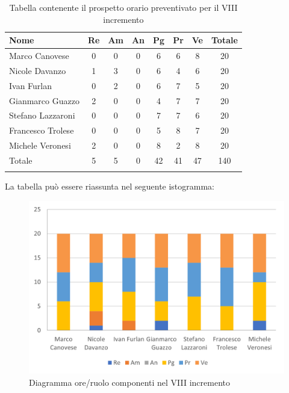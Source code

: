 \begin{longtable}{|l|c|c|c|c|c|c|c|}
	\hline
	\rowcolor{lighter-grayer}
	\textbf{Nome}     & \textbf{Re} & \textbf{Am} & \textbf{An} & \textbf{Pg} & \textbf{Pr} & \textbf{Ve} & \textbf{Totale} \\
	\hline
	\endfirsthead

	\hline
	Marco Canovese    & 0           & 0           & 0           & 6           & 6           & 8           & 20               \\
	\hline
	\hline
	Nicole Davanzo    & 1           & 3           & 0           & 6           & 4           & 6           & 20            \\
	\hline
	\hline
	Ivan Furlan       & 0           & 2           & 0           & 6           & 7           & 5           & 20               \\
	\hline
	\hline
	Gianmarco Guazzo  & 2           & 0           & 0           & 4           & 7           & 7           & 20               \\
	\hline
	\hline
	Stefano Lazzaroni & 0           & 0           & 0           & 7           & 7           & 6           & 20               \\
	\hline
	\hline
	Francesco Trolese & 0           & 0           & 0           & 5           & 8           & 7           & 20               \\
	\hline
	\hline
	Michele Veronesi  & 2           & 0           & 0           & 8           & 2           & 8           & 20               \\
	\hline
	\hline
	Totale            & 5           & 5          & 0          & 42           & 41           & 47           & 140              \\
	\hline
	\rowcolor{white}
	\caption{Tabella contenente il prospetto orario preventivato per il VIII incremento}
\end{longtable}


La tabella può essere riassunta nel seguente istogramma:

\begin{figure}[H]
	\centering
	\includegraphics[width=0.8\linewidth]{res/images/preventivo/dettaglio_termineimp/1-1.png}
	\caption{Diagramma ore/ruolo componenti nel VIII incremento}
	\label{fig:diagramma suddivisione ruoli VIII incremento}
\end{figure}

